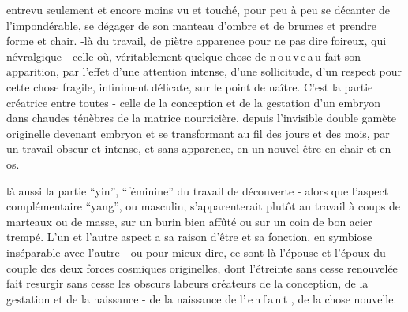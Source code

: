 
entrevu seulement et encore moins vu et touché, pour peu à peu se   décanter de l'impondérable, se dégager de son manteau d'ombre et de brumes et prendre forme et chair.    -là du travail, de piètre apparence pour ne pas dire foireux, qui   névralgique - celle où, véritablement quelque chose de \mbox{n\,o\,u\,v\,e\,a\,u} fait son apparition, par l'effet d'une attention intense, d'une sollicitude, d'un respect pour cette chose fragile, infiniment délicate, sur le point de naître. C'est la partie créatrice entre toutes - celle de la conception et de la gestation d'un  embryon dans  chaudes ténèbres de la matrice nourricière,  depuis l'invisible double gamète  originelle devenant embryon et se transformant au fil des jours et des mois, par un travail obscur et intense,  et sans apparence, en un nouvel être en chair et en os.

 là aussi la partie  ``yin'', ``féminine\deleted{\unsure{,}}'' du travail de découverte - alors que  l'aspect complémentaire ``yang'', ou masculin, s'apparenterait plutôt  au travail à coups de marteaux ou de masse, sur un burin bien affûté ou sur un coin de bon acier trempé. L'un et l'autre aspect a sa raison d'être et sa fonction, en symbiose inséparable  avec l'autre - ou pour mieux dire, ce sont là \uline{l'épouse} et \uline{l'époux} du couple des deux forces cosmiques originelles, dont l'étreinte  sans cesse renouvelée fait resurgir sans cesse les obscurs labeurs créateurs de la conception, de la gestation et de la naissance - de la naissance de \mbox{l'\,e\,n\,f\,a\,n\,t} , de la chose nouvelle.

